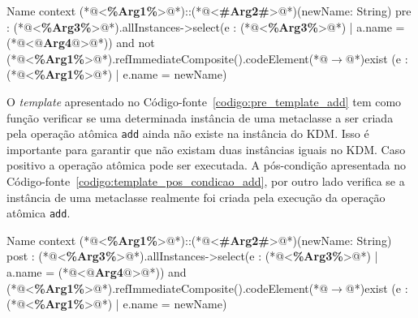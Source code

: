 \begin{codigo}[caption={[\textit{Template} OCL para realizar a pré-condição da operação atômica \texttt{add}.] \textit{Template} OCL para realizar a pré-condição da operação atômica \texttt{add}.},escapeinside={(*@}{@*)}, basicstyle=\footnotesize, label={codigo:pre_template_add}, language=OCL]{Name}
context (*@<\textbf{\%Arg1\%}>@*)::(*@<\textbf{\#Arg2\#}>@*)(newName: String)
pre : (*@<\textbf{\%Arg3\%}>@*).allInstances->select(e : (*@<\textbf{\%Arg3\%}>@*) | a.name = (*@<\textbf{$@$Arg4$@$}>@*)) and not (*@<\textbf{\%Arg1\%}>@*).refImmediateComposite().codeElement(*@$\rightarrow$@*)exist (e : (*@<\textbf{\%Arg1\%}>@*) | e.name = newName)
\end{codigo}

O \textit{template} apresentado no Código-fonte~\ref{codigo:pre_template_add} tem como função verificar se uma determinada instância de uma metaclasse a ser criada pela operação atômica \texttt{add} ainda não existe na instância do KDM. Isso é importante para garantir que não existam duas instâncias iguais no KDM. Caso positivo a operação atômica pode ser executada. A pós-condição apresentada no Código-fonte~\ref{codigo:template_pos_condicao_add}, por outro lado verifica se a instância de uma metaclasse realmente foi criada pela execução da operação atômica \texttt{add}.

\begin{codigo}[caption={[\textit{Template} OCL para realizar a pós-condição da operação atômica \texttt{add}.] \textit{Template} OCL para realizar a pós-condição da operação atômica \texttt{add}.},escapeinside={(*@}{@*)}, basicstyle=\footnotesize, label={codigo:template_pos_condicao_add}, language=OCL]{Name}
context (*@<\textbf{\%Arg1\%}>@*)::(*@<\textbf{\#Arg2\#}>@*)(newName: String)
post : (*@<\textbf{\%Arg3\%}>@*).allInstances->select(e : (*@<\textbf{\%Arg3\%}>@*) | a.name = (*@<\textbf{$@$Arg4$@$}>@*)) and (*@<\textbf{\%Arg1\%}>@*).refImmediateComposite().codeElement(*@$\rightarrow$@*)exist (e : (*@<\textbf{\%Arg1\%}>@*) | e.name = newName)
\end{codigo}

